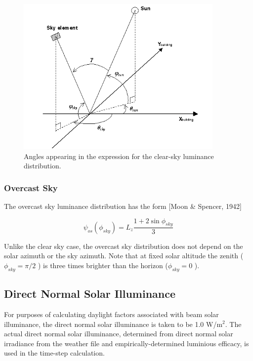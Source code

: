 \begin{figure}[hbtp] %
\centering
\includegraphics[width=0.9\textwidth, height=0.9\textheight, keepaspectratio=true]{media/image733.png}
\caption{Angles appearing in the expression for the clear-sky luminance distribution. \protect \label{fig:angles-appearing-in-the-expression-for}}
\end{figure}

\subsubsection{Overcast Sky}\label{overcast-sky}

The overcast sky luminance distribution has the form {[}Moon \& Spencer, 1942{]}

\begin{equation}
{\psi_{os}}({\phi_{sky}}) = {L_z}\frac{{1 + 2\sin {\phi_{sky}}}}{3}
\end{equation}

Unlike the clear sky case, the overcast sky distribution does not depend on the solar azimuth or the sky azimuth. Note that at fixed solar altitude the zenith (\({\phi_{sky}} = \pi /2\) ) is three times brighter than the horizon (\({\phi_{sky}} = 0\) ).

\subsection{Direct Normal Solar Illuminance}\label{direct-normal-solar-illuminance}

For purposes of calculating daylight factors associated with beam solar illuminance, the direct normal solar illuminance is taken to be 1.0 W/m\(^{2}\). The actual direct normal solar illuminance, determined from direct normal solar irradiance from the weather file and empirically-determined luminious efficacy, is used in the time-step calculation.

